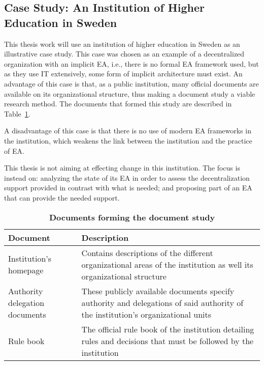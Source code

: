 \subsection{Case Study: An Institution of Higher Education in Sweden}
\label{sec:case}

This thesis work will use an institution of higher education in Sweden as an illustrative case study. This case was chosen as an example of a decentralized organization with an implicit EA, i.e., there is no formal EA framework used, but as they use IT extensively, some form of implicit architecture must exist. An advantage of this case is that, as a public institution, many official documents are available on its organizational structure, thus making a document study a viable research method. The documents that formed this study are described in Table~\ref{tab:doc_study}.

A disadvantage of this case is that there is no use of modern EA frameworks in the institution, which weakens the link between the institution and the practice of EA. 

This thesis is not aiming at effecting change in this institution. The focus is instead on: analyzing the state of its EA in order to assess the decentralization support provided in contrast with what is needed; and proposing part of an EA that can provide the needed support. 

\begin{table}  
  \begin{tabular}[c]{| p{} |
                       p{} | }
    \hline
    \textbf{Document} & \textbf{Description} \\
    \hline
    Institution's homepage & Contains descriptions of the different organizational areas of the institution as well its organizational structure \\
    \hline
    Authority delegation documents & These publicly available documents specify authority and delegations of said authority of the institution's organizational units \\
    \hline
    Rule book & The official rule book of the institution detailing rules and decisions that must be followed by the institution \\
    \hline
  \end{tabular}
  \caption{\textbf{Documents forming the document study}}
  \label{tab:doc_study}
\end{table}

